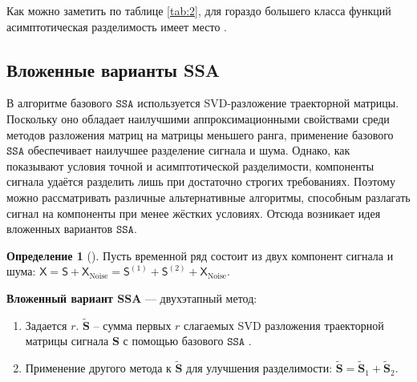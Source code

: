 \documentclass[12pt, specialist, subf
]{disser}
\theoremstyle{definition}
\newcommand{\SSA}{\texttt{SSA}}
\newcommand{\TS}{\mathsf{X}}
\newtheorem{definition}{Определение} %
\begin{document}
Как можно заметить по таблице \ref{tab:2}, для гораздо большего класса функций асимптотическая разделимость имеет место \cite{golyandina2001analysis}.
\begin{table}[H]
	\begin{center}
		\caption{Асимптотическая разделимость}
		\label{tab:2}
	\end{center}
\end{table}


\subsection{Вложенные варианты SSA}
\label{sec:eossa_and_autogroup}

В алгоритме базового $\SSA$ используется SVD-разложение траекторной матрицы. Поскольку оно обладает наилучшими аппроксимационными свойствами среди методов разложения матриц на матрицы меньшего ранга, применение базового $\SSA$ обеспечивает наилучшее разделение сигнала и шума. Однако, как показывают условия точной и асимптотической разделимости, компоненты сигнала удаётся разделить лишь при достаточно строгих требованиях. Поэтому можно рассматривать различные альтернативные алгоритмы, способным разлагать сигнал на компоненты при менее жёстких условиях.
Отсюда возникает идея вложенных вариантов $\SSA$.

\begin{definition}[\cite{Golyandina_2015}]

	Пусть временной ряд состоит из двух компонент сигнала и шума: $\TS = \mathsf{S} + \TS_{\mathrm{Noise}}=
		\mathsf{S}^{(1)} + \mathsf{S}^{(2)} + \TS_{\mathrm{Noise}}$.

	\textbf{Вложенный вариант SSA} — двухэтапный метод:
	\begin{enumerate}
		\item Задается $r$. $\tilde {\mathbf{S}}$ -- сумма первых $r$ слагаемых SVD разложения траекторной матрицы сигнала $\mathbf S$ с помощью базового $\SSA$ .
		\item Применение другого метода к $\tilde{\mathbf{S}}$ для улучшения разделимости: $\tilde{\mathbf{S }} = \tilde{\mathbf{S}}_1 + \tilde{\mathbf{S } }_2$.
	\end{enumerate}
\end{definition}
\end{document}
